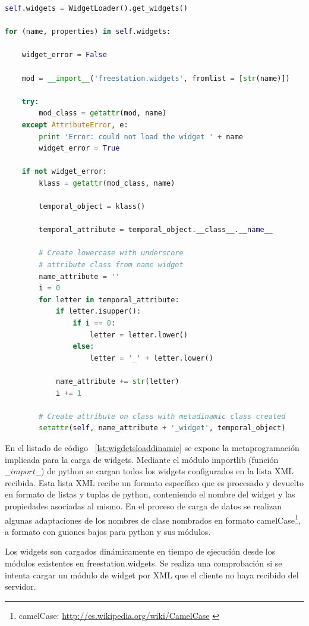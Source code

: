 \begin{lstlisting}[language={Python}, label={lst:wigdetsloaddinamic},
texcl=false, caption={Carga dinámica de clases - Metaprogramación}]
self.widgets = WidgetLoader().get_widgets()

for (name, properties) in self.widgets:

    widget_error = False
    
    mod = __import__('freestation.widgets', fromlist = [str(name)])
    
    try:
        mod_class = getattr(mod, name)
    except AttributeError, e:
        print 'Error: could not load the widget ' + name
        widget_error = True
      
    if not widget_error:  
        klass = getattr(mod_class, name)
        
        temporal_object = klass()
        
        temporal_attribute = temporal_object.__class__.__name__
           
        # Create lowercase with underscore
        # attribute class from name widget
        name_attribute = ''
        i = 0
        for letter in temporal_attribute:
            if letter.isupper():
                if i == 0:
                    letter = letter.lower()
                else:
                    letter = '_' + letter.lower()
                
            name_attribute += str(letter)
            i += 1
           
        # Create attribute on class with metadinamic class created
        setattr(self, name_attribute + '_widget', temporal_object)
\end{lstlisting}

En el listado de código ~\ref{lst:wigdetsloaddinamic} se expone la
metaprogramación implicada para la carga de widgets. Mediante el módulo
importlib (función $\_\_import\_\_$) de python se cargan todos los widgets
configurados en la lista XML recibida. Esta lista XML recibe un formato 
específico que es procesado y devuelto en formato de listas y 
tuplas de python, conteniendo el nombre del widget y las
propiedades asociadas al mismo. En el proceso de carga de datos se realizan
algunas adaptaciones de los nombres de clase nombrados en formato 
camelCase\footnote{camelCase: \url{http://es.wikipedia.org/wiki/CamelCase}
\label{ftn:camelCase}}, a formato con guiones bajos para python y sus módulos.

Los widgets son cargados dinámicamente en tiempo de ejecución desde los módulos
existentes en freestation.widgets. Se realiza una comprobación si se intenta
cargar un módulo de widget por XML que el cliente no haya recibido del servidor.

